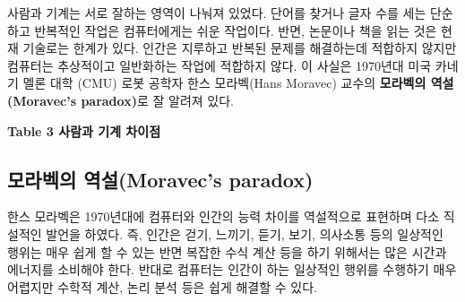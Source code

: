 \documentclass[smallextended]{svjour3}       %
\begin{document}
사람과 기계는 서로 잘하는 영역이 나눠져 있었다. 단어를 찾거나 글자 수를
세는 단순하고 반복적인 작업은 컴퓨터에게는 쉬운 작업이다. 반면, 논문이나
책을 읽는 것은 현재 기술로는 한계가 있다. 인간은 지루하고 반복된 문제를
해결하는데 적합하지 않지만 컴퓨터는 추상적이고 일반화하는 작업에
적합하지 않다. 이 사실은 1970년대 미국 카네기 멜론 대학 (CMU) 로봇
공학자 한스 모라벡(Hans Moravec) 교수의 \textbf{모라벡의 역설(Moravec's
paradox)}로 잘 알려져 있다.

\begin{table}[H]
\centering
{}
\end{table}

\textbf{Table 3 사람과 기계 차이점}

\hypertarget{uxbaa8uxb77cuxbca1uxc758-uxc5eduxc124moravecs-paradox}{%
\subsection{모라벡의 역설(Moravec's
paradox)}\label{uxbaa8uxb77cuxbca1uxc758-uxc5eduxc124moravecs-paradox}}

한스 모라벡은 1970년대에 컴퓨터와 인간의 능력 차이를 역설적으로 표현하며
다소 직설적인 발언을 하였다. 즉, 인간은 걷기, 느끼기, 듣기, 보기,
의사소통 등의 일상적인 행위는 매우 쉽게 할 수 있는 반면 복잡한 수식 계산
등을 하기 위해서는 많은 시간과 에너지를 소비해야 한다. 반대로 컴퓨터는
인간이 하는 일상적인 행위를 수행하기 매우 어렵지만 수학적 계산, 논리
분석 등은 쉽게 해결할 수 있다.
\end{document}
